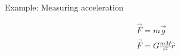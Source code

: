   \begin{frame}
    \begin{PointSix}{Example: Measuring acceleration}
      \begin{minipage}[t]{0.3\textwidth}
        \end{minipage}\begin{minipage}[]{0.7\textwidth}
      \centering
      \begin{align*}
      &\vec{F} = m \vec{g} \\
      &\vec{F} = G\frac{mM}{r^2}\hat{r} \\
      \end{align*}
      \end{minipage}
      \centering
    \end{PointSix}
    \end{frame}


